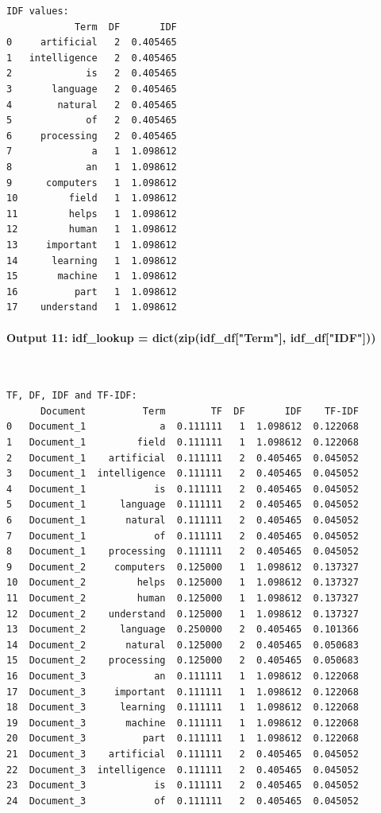 \documentclass[12pt,a4paper,oneside]{report}
\begin{document}
\begin{Verbatim}[commandchars=\\\{\},breaklines=true,breakanywhere=true,fontsize=\scriptsize,frame=leftline,framesep=2mm,rulecolor=\color{gray}]
IDF values:
            Term  DF       IDF
0     artificial   2  0.405465
1   intelligence   2  0.405465
2             is   2  0.405465
3       language   2  0.405465
4        natural   2  0.405465
5             of   2  0.405465
6     processing   2  0.405465
7              a   1  1.098612
8             an   1  1.098612
9      computers   1  1.098612
10         field   1  1.098612
11         helps   1  1.098612
12         human   1  1.098612
13     important   1  1.098612
14      learning   1  1.098612
15       machine   1  1.098612
16          part   1  1.098612
17    understand   1  1.098612
\end{Verbatim}
\paragraph{Output 11: idf\_lookup = dict(zip(idf\_df["Term"], idf\_df["IDF"]))}\mbox{}\\[-1ex]
\begin{Verbatim}[commandchars=\\\{\},breaklines=true,breakanywhere=true,fontsize=\scriptsize,frame=leftline,framesep=2mm,rulecolor=\color{gray}]
TF, DF, IDF and TF-IDF:
      Document          Term        TF  DF       IDF    TF-IDF
0   Document_1             a  0.111111   1  1.098612  0.122068
1   Document_1         field  0.111111   1  1.098612  0.122068
2   Document_1    artificial  0.111111   2  0.405465  0.045052
3   Document_1  intelligence  0.111111   2  0.405465  0.045052
4   Document_1            is  0.111111   2  0.405465  0.045052
5   Document_1      language  0.111111   2  0.405465  0.045052
6   Document_1       natural  0.111111   2  0.405465  0.045052
7   Document_1            of  0.111111   2  0.405465  0.045052
8   Document_1    processing  0.111111   2  0.405465  0.045052
9   Document_2     computers  0.125000   1  1.098612  0.137327
10  Document_2         helps  0.125000   1  1.098612  0.137327
11  Document_2         human  0.125000   1  1.098612  0.137327
12  Document_2    understand  0.125000   1  1.098612  0.137327
13  Document_2      language  0.250000   2  0.405465  0.101366
14  Document_2       natural  0.125000   2  0.405465  0.050683
15  Document_2    processing  0.125000   2  0.405465  0.050683
16  Document_3            an  0.111111   1  1.098612  0.122068
17  Document_3     important  0.111111   1  1.098612  0.122068
18  Document_3      learning  0.111111   1  1.098612  0.122068
19  Document_3       machine  0.111111   1  1.098612  0.122068
20  Document_3          part  0.111111   1  1.098612  0.122068
21  Document_3    artificial  0.111111   2  0.405465  0.045052
22  Document_3  intelligence  0.111111   2  0.405465  0.045052
23  Document_3            is  0.111111   2  0.405465  0.045052
24  Document_3            of  0.111111   2  0.405465  0.045052
\end{Verbatim}
\end{document}
